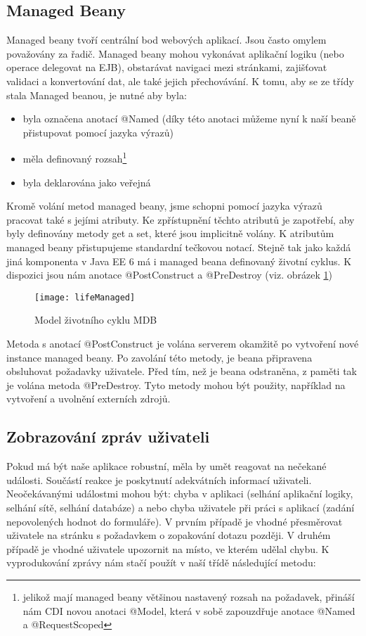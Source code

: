 \documentclass[122pt,oneside]{fithesis}
\begin{document}
\subsection{Managed Beany} 
Managed beany tvoří centrální bod webových aplikací. Jsou často omylem považovány za řadič. Managed beany mohou vykonávat aplikační logiku (nebo operace delegovat na EJB), obstarávat navigaci mezi stránkami, zajišťovat validaci a konvertování dat, ale také jejich přechovávání. K tomu, aby se ze třídy stala Managed beanou, je nutné aby byla:
\begin{itemize}
  \item byla označena anotací @Named (díky této anotaci můžeme nyní k naší beaně přistupovat pomocí jazyka výrazů)
  \item měla definovaný rozsah\footnote[1]{jelikož mají managed beany většinou nastavený rozsah na požadavek, přináší nám CDI novou anotaci @Model, která v sobě zapouzdřuje anotace @Named a @RequestScoped}
  \item byla deklarována jako veřejná
\end{itemize}

Kromě volání metod managed beany, jsme schopni pomocí jazyka výrazů pracovat také s jejími atributy. Ke zpřístupnění těchto atributů je zapotřebí, aby byly definovány metody get a set, které jsou implicitně volány. K atributům managed beany přistupujeme standardní tečkovou notací. Stejně tak jako každá jiná komponenta v Java EE 6 má i managed beana definovaný životní cyklus. K dispozici jsou nám anotace @PostConstruct a @PreDestroy (viz. obrázek \ref{fig:mdb})

\begin{figure}[!ht]
\centering
\texttt{[image: lifeManaged]}
\caption{Model životního cyklu MDB}
\label{fig:mdb}
\end{figure}

Metoda s anotací @PostConstruct je volána serverem okamžitě po vytvoření nové instance managed beany. Po zavolání této metody, je beana připravena obsluhovat požadavky uživatele. Před tím, než je beana odstraněna, z paměti tak je volána metoda @PreDestroy. Tyto metody mohou být použity, například na vytvoření a uvolnění externích zdrojů.

\subsection{Zobrazování zpráv uživateli}
\label{jsfMessage}
Pokud má být naše aplikace robustní, měla by umět reagovat na nečekané události. Součástí reakce je poskytnutí adekvátních informací uživateli. Neočekávanými událostmi mohou být: chyba v aplikaci (selhání aplikační logiky, selhání sítě, selhání databáze) a nebo chyba uživatele při práci s aplikací (zadání nepovolených hodnot do formuláře). V prvním případě je vhodné přesměrovat uživatele na stránku s požadavkem o zopakování dotazu později. V druhém případě je vhodné uživatele upozornit na místo, ve kterém udělal chybu. K vyprodukování zprávy nám stačí použít v naší třídě následující metodu:
\end{document}
